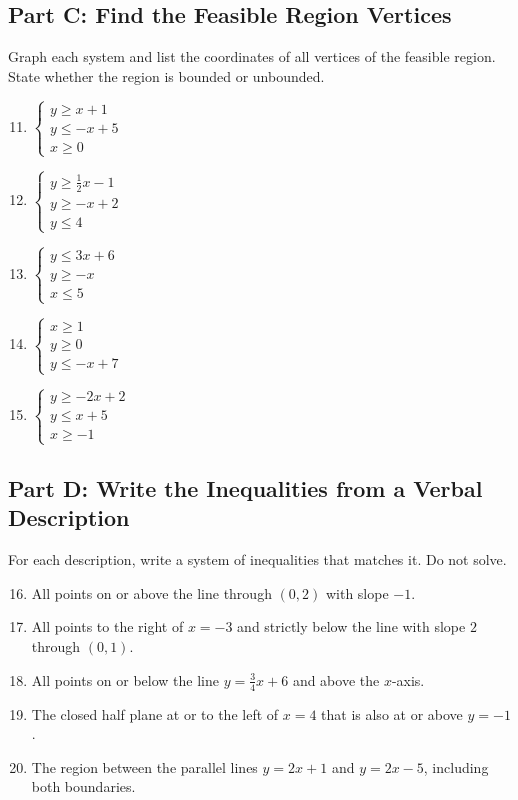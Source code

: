 \documentclass[14pt]{extarticle}
\begin{document}
\subsection*{Part C: Find the Feasible Region Vertices}
Graph each system and list the coordinates of all vertices of the feasible region. State whether the region is bounded or unbounded.
\begin{enumerate}
  \setcounter{enumi}{10}
  \item \(\begin{cases} y \ge x + 1 \\ y \le -x + 5 \\ x \ge 0 \end{cases}\)
  \item \(\begin{cases} y \ge \tfrac{1}{2}x - 1 \\ y \ge -x + 2 \\ y \le 4 \end{cases}\)
  \item \(\begin{cases} y \le 3x + 6 \\ y \ge -x \\ x \le 5 \end{cases}\)
  \item \(\begin{cases} x \ge 1 \\ y \ge 0 \\ y \le -x + 7 \end{cases}\)
  \item \(\begin{cases} y \ge -2x + 2 \\ y \le x + 5 \\ x \ge -1 \end{cases}\)
\end{enumerate}

\subsection*{Part D: Write the Inequalities from a Verbal Description}
For each description, write a system of inequalities that matches it. Do not solve.
\begin{enumerate}
  \setcounter{enumi}{15}
  \item All points on or above the line through \((0,2)\) with slope \(-1\).
  \item All points to the right of \(x = -3\) and strictly below the line with slope \(2\) through \((0,1)\).
  \item All points on or below the line \(y = \tfrac{3}{4}x + 6\) and above the \(x\)-axis.
  \item The closed half plane at or to the left of \(x = 4\) that is also at or above \(y = -1\).
  \item The region between the parallel lines \(y = 2x + 1\) and \(y = 2x - 5\), including both boundaries.
\end{enumerate}
\end{document}
